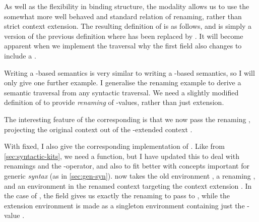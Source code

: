
As well as the flexibility in binding structure, the \AgdaFunction{$\Box$}
modality allows us to use the somewhat more well behaved and standard
relation of renaming, rather than strict context extension.
The resulting definition of  is as follows, and is
simply a version of the previous definition where \AgdaFunction{$\bigcirc$}
has been replaced by \AgdaFunction{$\Box$}.
It will become apparent when we implement the traversal  why
the first field also changes to include a \AgdaFunction{$\Box$}.


Writing a \AgdaFunction{$\Box$}-based semantics is very similar to writing a
\AgdaFunction{$\bigcirc$}-based semantics, so I will only give one further
example.
I generalise the renaming example to derive a semantic traversal from any
syntactic traversal.
We need a slightly modified definition of  to provide
\emph{renaming} of \AgdaBound{$\V$}-values, rather than just extension.


The interesting feature of the corresponding  is that
we now pass  the renaming , projecting
the original context \AgdaBound{$\Gamma$} out of the
-extended context
.


With  fixed, I also give the corresponding implementation
of .
Like  from \cref{sec:syntactic-kits}, we need a
 function, but I have updated this to deal with renamings
and the \AgdaFunction{$\Box$}-operator, and also to fit better with concepts
important for generic \emph{syntax} (as in \cref{sec:gen-syn}).
 now takes the old environment \AgdaBound{$\rho$}%
\AgdaSpace{}\AgdaSymbol{:}\AgdaSpace{}\AgdaFunction{[}\AgdaSpace{}%
\AgdaBound{$\V$}\AgdaSpace{}\AgdaFunction{]}\AgdaSpace{}\AgdaBound{$\Gamma$}%
\AgdaSpace{}\AgdaSpace{}\AgdaBound{$\Delta$}, a
renaming \AgdaSpace{}\AgdaSymbol{:}\AgdaSpace{}%
\AgdaSpace{}\AgdaBound{$\Gamma^{+}$}\AgdaSpace{}%
\AgdaBound{$\Gamma$}, and an environment \AgdaBound{$\sigma$} in the renamed
context \AgdaBound{$\Gamma^{+}$} targeting the context extension
.
In the  case of , the
 field gives us exactly the renaming to
pass to , while the extension environment
\AgdaBound{$\sigma$} is made as a singleton environment containing just the
-value .

